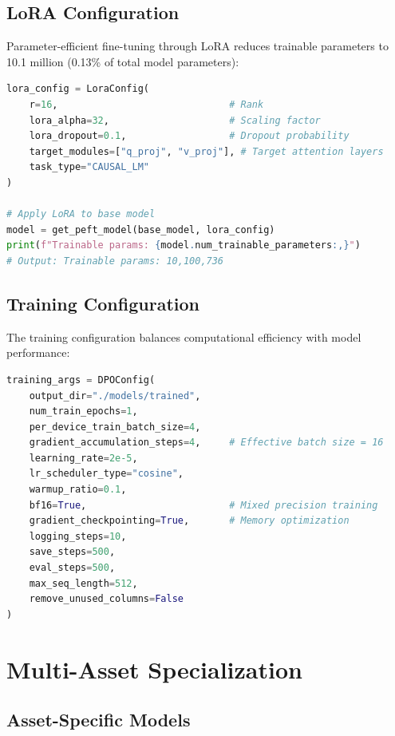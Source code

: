 \documentclass{report}
\begin{document}
\subsection{LoRA Configuration}

Parameter-efficient fine-tuning through LoRA reduces trainable parameters to 10.1 million (0.13\% of total model parameters):

\begin{lstlisting}[language=Python, caption=LoRA configuration]
lora_config = LoraConfig(
    r=16,                              # Rank
    lora_alpha=32,                     # Scaling factor
    lora_dropout=0.1,                  # Dropout probability
    target_modules=["q_proj", "v_proj"], # Target attention layers
    task_type="CAUSAL_LM"
)

# Apply LoRA to base model
model = get_peft_model(base_model, lora_config)
print(f"Trainable params: {model.num_trainable_parameters:,}")
# Output: Trainable params: 10,100,736
\end{lstlisting}

\subsection{Training Configuration}

The training configuration balances computational efficiency with model performance:

\begin{lstlisting}[language=Python, caption=Training hyperparameters]
training_args = DPOConfig(
    output_dir="./models/trained",
    num_train_epochs=1,
    per_device_train_batch_size=4,
    gradient_accumulation_steps=4,     # Effective batch size = 16
    learning_rate=2e-5,
    lr_scheduler_type="cosine",
    warmup_ratio=0.1,
    bf16=True,                         # Mixed precision training
    gradient_checkpointing=True,       # Memory optimization
    logging_steps=10,
    save_steps=500,
    eval_steps=500,
    max_seq_length=512,
    remove_unused_columns=False
)
\end{lstlisting}

\section{Multi-Asset Specialization}

\subsection{Asset-Specific Models}
\end{document}
